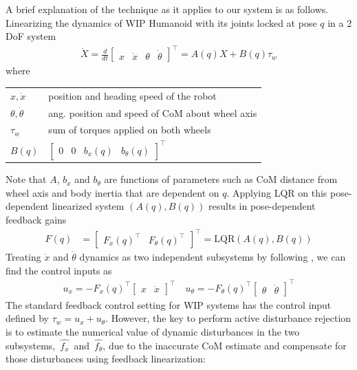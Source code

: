 \documentclass[letterpaper, 10 pt, conference]{ieeeconf}  %
\makeatletter
\newenvironment{conditions}
  {\par\vspace{\abovedisplayskip}\noindent\begin{tabular}{>{$}l<{$} @{${}={}$} l}}
  {\end{tabular}\par\vspace{\belowdisplayskip}}
\makeatother
\begin{document}
A brief explanation of the technique as it applies to our system is as follows. Linearizing the dynamics of WIP Humanoid with its joints locked at pose $q$ in a 2 \ac{DoF} system
\begin{align}
    \dot{X} = \frac{d}{dt} \begin{bmatrix} x & \dot{x} & \theta & \dot\theta \end{bmatrix}^\top = A(q)X + B(q)\tau_w
\end{align}
where
\begin{conditions}
x, \dot{x} & position and heading speed of the robot \\
\theta, \dot\theta & ang. position and speed of CoM about wheel axis \\
\tau_w & sum of torques applied on both wheels \\
B(q) & $\begin{bmatrix} 0 & 0 & b_x(q) & b_{\theta}(q) \end{bmatrix}^\top$
\end{conditions}
Note that $A$, $b_x$ and $b_{\theta}$ are functions of parameters such as \ac{CoM} distance from wheel axis and body inertia that are dependent on $q$. Applying LQR on this pose-dependent linearized system $(A(q), B(q))$ results in pose-dependent feedback gains
\begin{align}
    F(q) &= \begin{bmatrix} F_x(q)^\top & F_\theta(q)^\top \end{bmatrix}^\top = \mbox{LQR}(A(q), B(q))
\end{align}
Treating $\dot{x}$ and $\dot{\theta}$ dynamics as two independent subsystems by following \cite{miklosovic2005dynamic}, we can find the control inputs as
\begin{align}
    u_x = -F_x(q)^\top \begin{bmatrix} x & \dot{x} \end{bmatrix}^\top \quad u_\theta = -F_\theta(q)^\top \begin{bmatrix} \theta & \dot{\theta} \end{bmatrix}^\top\nonumber
\end{align}
The standard feedback control setting for \ac{WIP} systems has the control input defined by $\tau_w = u_x + u_{\theta}$. However, the key to perform active disturbance rejection is to estimate the numerical value of dynamic disturbances in the two subsystems,~$\hat{f_x}$~and~$\hat{f_{\theta}}$, due to the inaccurate \ac{CoM} estimate and compensate for those disturbances using feedback linearization:
\end{document}
